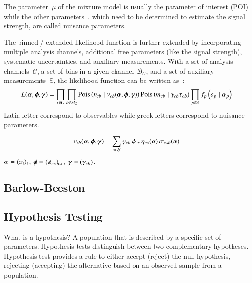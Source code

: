 The parameter~$\mu$ of the mixture model is usually the parameter of
interest (POI) while the other parameters~\boldtheta, which need to be
determined to estimate the signal strength, are called nuisance
parameters.


The binned / extended likelihood function is further extended by
incorporating multiple analysis channels, additional free parameters
(like the signal strength), systematic uncertainties, and auxiliary
measurements. With a set of analysis channels~$\mathcal{C}$, a set of
bins in a given channel~$\mathcal{B}_\mathcal{C}$, and a set of
auxiliary measurements~$\mathbb{S}$, the likelihood function can be
written as~\cite{cranmer2012}:
\begin{align*}
  L(\boldalpha, \boldphi, \boldgamma) =
  \prod_{c \in \mathcal{C}} \prod_{b \in \mathcal{B}_{\mathcal{C}}}
  \mathrm{Pois}\left( n_{cb} \mid \nu_{cb}(\boldalpha, \boldphi, \boldgamma) \right)
  \mathrm{Pois}\left(m_{cb} \mid  \gamma_{cb} \tau_{cb} \right)
  \prod_{p \in \mathbb{S}} f_p\left(a_p \mid \alpha_p \right)
\end{align*}
Latin letter correspond to observables while greek letters correspond
to nuisance parameters.

\begin{align*}
  \nu_{cb}(\boldalpha, \boldphi, \boldgamma) = \sum_{s \in \mathcal{S}} \gamma_{cb} \, \phi_{cs} \, \eta_{cs}(\boldalpha) \, \sigma_{csb}(\boldalpha)
\end{align*}
$\boldalpha = (\alpha_i)_i$, $\boldphi = (\phi_{cs})_{cs}$,
$\boldgamma = (\gamma_{cb})$.




\subsection{Barlow-Beeston}%
\label{sec:barlow_beeston}

\cite{barlow1993,conway2011}


\subsection{Hypothesis Testing}

What is a hypothesis? A population that is described by a specific set
of parameters. Hypothesis tests distinguish between two complementary
hypotheses. Hypothesis test provides a rule to either accept (reject)
the null hypothesis, rejecting (accepting) the alternative based on an
observed sample from a population.


